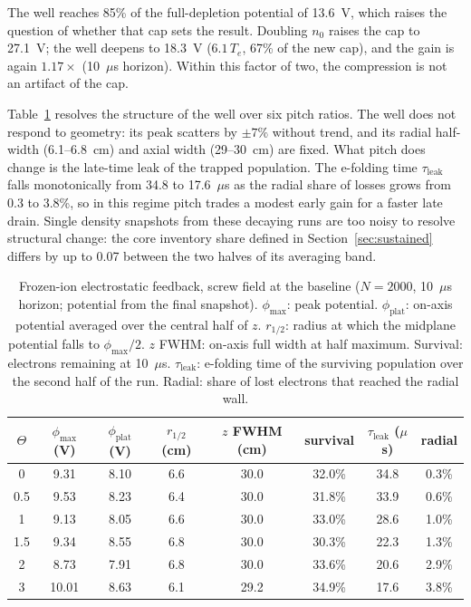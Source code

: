 \documentclass[11pt]{article}
\newcommand{\us}{\ensuremath{\mu}s}
\begin{document}
The well reaches 85\% of the full-depletion potential of 13.6~V, which raises the question of whether that cap sets the result. Doubling $n_0$ raises the cap to 27.1~V; the well deepens to 18.3~V ($6.1\,T_e$, 67\% of the new cap), and the gain is again $1.17\times$ (10~\us{} horizon). Within this factor of two, the compression is not an artifact of the cap.

Table~\ref{tab:frozen} resolves the structure of the well over six pitch ratios. The well does not respond to geometry: its peak scatters by $\pm7\%$ without trend, and its radial half-width (6.1--6.8~cm) and axial width (29--30~cm) are fixed. What pitch does change is the late-time leak of the trapped population. The e-folding time $\tau_{\mathrm{leak}}$ falls monotonically from 34.8 to 17.6~\us{} as the radial share of losses grows from 0.3 to 3.8\%, so in this regime pitch trades a modest early gain for a faster late drain. Single density snapshots from these decaying runs are too noisy to resolve structural change: the core inventory share defined in Section~\ref{sec:sustained} differs by up to 0.07 between the two halves of its averaging band.

\begin{table}[htbp]
\centering
\small
\caption{Frozen-ion electrostatic feedback, screw field at the baseline ($N = 2000$, 10~\us{} horizon; potential from the final snapshot). $\phi_{\max}$: peak potential. $\phi_{\mathrm{plat}}$: on-axis potential averaged over the central half of $z$. $r_{1/2}$: radius at which the midplane potential falls to $\phi_{\max}/2$. $z$ FWHM: on-axis full width at half maximum. Survival: electrons remaining at 10~\us. $\tau_{\mathrm{leak}}$: e-folding time of the surviving population over the second half of the run. Radial: share of lost electrons that reached the radial wall.}
\label{tab:frozen}
\begin{tabular}{cccccccc}
\toprule
$\Theta$ & $\phi_{\max}$ (V) & $\phi_{\mathrm{plat}}$ (V) & $r_{1/2}$ (cm) & $z$ FWHM (cm) & survival & $\tau_{\mathrm{leak}}$ (\us) & radial \\
\midrule
0   & 9.31  & 8.10 & 6.6 & 30.0 & 32.0\% & 34.8 & 0.3\% \\
0.5 & 9.53  & 8.23 & 6.4 & 30.0 & 31.8\% & 33.9 & 0.6\% \\
1   & 9.13  & 8.05 & 6.6 & 30.0 & 33.0\% & 28.6 & 1.0\% \\
1.5 & 9.34  & 8.55 & 6.8 & 30.0 & 30.3\% & 22.3 & 1.3\% \\
2   & 8.73  & 7.91 & 6.8 & 30.0 & 33.6\% & 20.6 & 2.9\% \\
3   & 10.01 & 8.63 & 6.1 & 29.2 & 34.9\% & 17.6 & 3.8\% \\
\bottomrule
\end{tabular}
\end{table}
\end{document}
